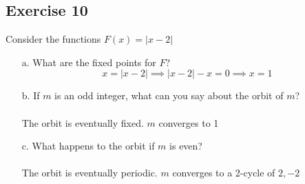 \documentclass{article}
\begin{document}
\subsection*{Exercise 10}
Consider the functions $F(x) = |x - 2|$
\begin{itemize}
	\item[a.] What are the fixed points for $F$?
		\[
			x = |x - 2| \implies |x - 2| - x = 0 \implies x = 1
		\]
	\item[b.] If $m$ is an odd integer, what can you say about the orbit of $m$?
		\paragraph*{}
		The orbit is eventually fixed. $m$ converges to 1
	\item[c.] What happens to the orbit if $m$ is even?
		\paragraph*{}
		The orbit is eventually periodic. $m$ converges to a 2-cycle of $2,-2$
\end{itemize}
\end{document}
